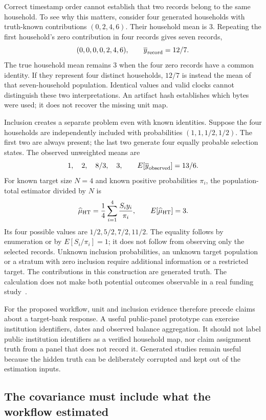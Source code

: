 Correct timestamp order cannot establish that two records belong to the same
household. To see why this matters, consider four generated households with
truth-known contributions $(0,2,4,6)$. Their household mean is $3$. Repeating
the first household's zero contribution in four records gives seven records,
\[
 (0,0,0,0,2,4,6),\qquad \overline{y}_{\rm record}=12/7.
\]
The true household mean remains $3$ when the four zero records have a common
identity. If they represent four distinct households, $12/7$ is instead the
mean of that seven-household population. Identical values and valid clocks
cannot distinguish these two interpretations. An artifact hash establishes
which bytes were used; it does not recover the missing unit map.

Inclusion creates a separate problem even with known identities. Suppose the
four households are independently included with probabilities
$(1,1,1/2,1/2)$. The first two are always present; the last two generate four
equally probable selection states. The observed unweighted means are
\[
 1,\quad 2,\quad 8/3,\quad 3,
 \qquad
 E[\overline{y}_{\rm observed}]=13/6.
\]
For known target size $N=4$ and known positive probabilities $\pi_i$, the
population-total estimator divided by $N$ is
\[
 \widehat\mu_{\rm HT}=\frac{1}{4}\sum_{i=1}^{4}
       \frac{S_i y_i}{\pi_i},
 \qquad
 E[\widehat\mu_{\rm HT}]=3.
\]
Its four possible values are $1/2,5/2,7/2,11/2$. The equality follows by
enumeration or by $E[S_i/\pi_i]=1$; it does not follow from observing only
the selected records. Unknown inclusion probabilities, an unknown target
population or a stratum with zero inclusion require additional information
or a restricted target. The contributions in this construction are generated
truth. The calculation does not make both potential outcomes observable in
a real funding study~\citep{exec13_funding_exact}.

For the proposed workflow, unit and inclusion evidence therefore precede
claims about a target-bank response. A useful public-panel prototype can
exercise institution identifiers, dates and observed balance aggregation.
It should not label public institution identifiers as a verified household
map, nor claim assignment truth from a panel that does not record it.
Generated studies remain useful because the hidden truth can be deliberately
corrupted and kept out of the estimation inputs.

\subsection{The covariance must include what the workflow estimated}

